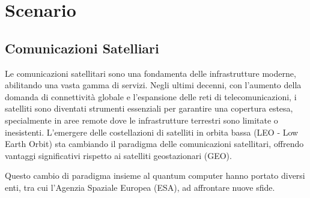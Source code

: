 
\chapter{Scenario} %

\label{Chapter3} %



\section{Comunicazioni Satelliari}

Le comunicazioni satellitari sono una fondamenta delle infrastrutture moderne, abilitando una vasta gamma di servizi.
Negli ultimi decenni, con l'aumento della domanda di connettività globale e l'espansione delle reti di telecomunicazioni, i satelliti sono diventati strumenti essenziali per garantire una copertura estesa, specialmente in aree remote dove le infrastrutture terrestri sono limitate o inesistenti.
L'emergere delle costellazioni di satelliti in orbita bassa (LEO - Low Earth Orbit) sta cambiando il paradigma delle comunicazioni satellitari, offrendo vantaggi significativi rispetto ai satelliti geostazionari (GEO). 

Questo cambio di paradigma insieme al quantum computer hanno portato diversi enti, tra cui l'Agenzia Spaziale Europea (ESA), ad affrontare nuove sfide.

